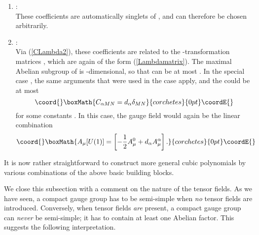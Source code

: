 \documentclass[a4paper,11pt]{article}
\begin{document}
\begin{enumerate}
\item {}\coordHE{}:\\
These coefficients are automatically singlets of \coordHE{}, and can
therefore be chosen arbitrarily.

\item {}\coordHE{}:\\
Via (\ref{CLambda2}), these
coefficients are related to the \coordHE{}-transformation
matrices \coordHE{}, which are again of the
form (\ref{Lambdamatrix}). The maximal Abelian subgroup of \coordHE{}
is \coordHE{}-dimensional, so that \coordHE{} can be at most \coordHE{}. In the
special case \coordHE{}, the same arguments that were used in the
case \coordHE{} apply, and the \coordHE{} could be at
most
\begin{displaymath}\coord{}\boxMath{
    C_{\alpha MN}=d_{\alpha}\delta_{MN}
}{corchetes}{0pt}\coordE{}\end{displaymath}
for some constants \coordHE{}. In this case, the \coordHE{} gauge
field would again be the linear combination
\begin{displaymath}\coord{}\boxMath{
A_{\mu}[U(1)]=\left[-\frac{1}{2}A_{\mu}^{0}+d_{\alpha}
        A_{\mu}^{\alpha}\right].
}{corchetes}{0pt}\coordE{}\end{displaymath}




\end{enumerate}

It is now rather straightforward to construct more general cubic
polynomials by various combinations of the above basic building
blocks.


We close this subsection with a comment on the nature of the tensor
fields. As we have seen, a compact gauge
group \coordHE{} has to be semi-simple when \emph{no} tensor fields
are introduced. Conversely, when tensor fields \emph{are} present, a
compact gauge group \coordHE{} can \emph{never} be semi-simple; it
has to contain at least one Abelian factor.  This suggests the following
interpretation.
\end{document}
